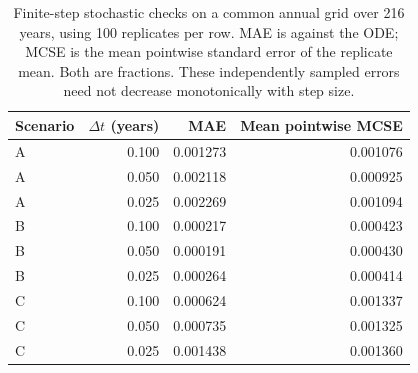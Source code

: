 \begin{table}[!htbp]\centering\small
\caption{Finite-step stochastic checks on a common annual grid over 216 years, using 100 replicates per row. MAE is against the ODE; MCSE is the mean pointwise standard error of the replicate mean. Both are fractions. These independently sampled errors need not decrease monotonically with step size.}\label{tab:convergence}
\begin{tabular}{lrrr}\toprule Scenario & $\Delta t$ (years) & MAE & Mean pointwise MCSE\\\midrule
A & 0.100 & 0.001273 & 0.001076\\
A & 0.050 & 0.002118 & 0.000925\\
A & 0.025 & 0.002269 & 0.001094\\
B & 0.100 & 0.000217 & 0.000423\\
B & 0.050 & 0.000191 & 0.000430\\
B & 0.025 & 0.000264 & 0.000414\\
C & 0.100 & 0.000624 & 0.001337\\
C & 0.050 & 0.000735 & 0.001325\\
C & 0.025 & 0.001438 & 0.001360\\
\bottomrule\end{tabular}\end{table}
